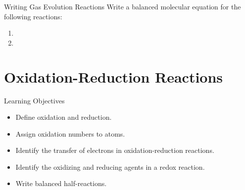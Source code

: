 \documentclass[notes=only]{beamer}
\begin{document}

\begin{frame}[t]{Writing Gas Evolution Reactions}
	Write a balanced molecular equation for the following reactions:

	\begin{enumerate}
		\item {}

			\vspace{5em}

		\item {}

			\vspace{5em}
	\end{enumerate}
\end{frame}


%
%

\section{Oxidation-Reduction Reactions}

\begin{frame}{Learning Objectives}
	\begin{itemize}
		\item Define oxidation and reduction.
		\item Assign oxidation numbers to atoms.
		\item Identify the transfer of electrons in oxidation-reduction reactions.
		\item Identify the oxidizing and reducing agents in a redox
			reaction.
		\item Write balanced half-reactions.
	\end{itemize}
\end{frame}
\end{document}
